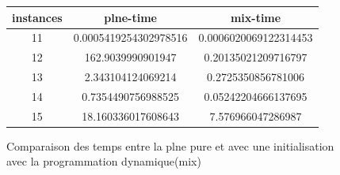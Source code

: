 \documentclass[a4paper]{memoir}
\begin{document}
\begin{figure}
\begin{tabular}{|c||c||c|}
\hline
instances & plne-time & mix-time \\ 
\hline
11 & 0.0005419254302978516 & 0.0006020069122314453 \\ 
\hline
12 & 162.9039990901947 & 0.20135021209716797 \\ 
\hline
13 & 2.343104124069214 & 0.2725350856781006 \\ 
\hline
14 & 0.7354490756988525 & 0.05242204666137695 \\ 
\hline
15 & 18.160336017608643 & 7.576966047286987 \\ 
\hline
\end{tabular}
\caption{Comparaison des temps entre la plne pure et avec une initialisation avec la programmation dynamique(mix)}
\end{figure}

    
     
\end{document}
